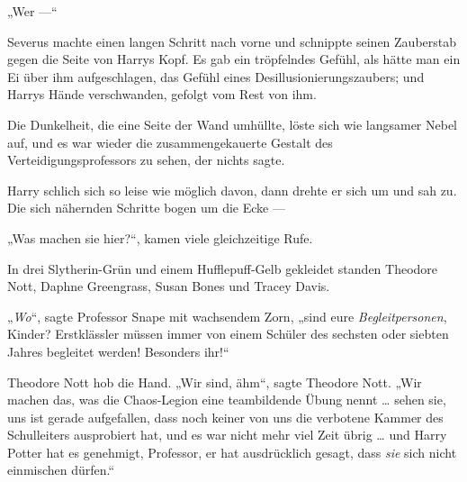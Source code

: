 „Wer —“

Severus machte einen langen Schritt nach vorne und schnippte seinen Zauberstab gegen die Seite von Harrys Kopf. Es gab ein tröpfelndes Gefühl, als hätte man ein Ei über ihm aufgeschlagen, das Gefühl eines Desillusionierungszaubers; und Harrys Hände verschwanden, gefolgt vom Rest von ihm.

Die Dunkelheit, die eine Seite der Wand umhüllte, löste sich wie langsamer Nebel auf, und es war wieder die zusammengekauerte Gestalt des Verteidigungsprofessors zu sehen, der nichts sagte.

Harry schlich sich so leise wie möglich davon, dann drehte er sich um und sah zu. Die sich nähernden Schritte bogen um die Ecke —

„Was machen sie hier?“, kamen viele gleichzeitige Rufe.

In drei Slytherin-Grün und einem Hufflepuff-Gelb gekleidet standen Theodore Nott, Daphne Greengrass, Susan Bones und Tracey Davis.

„\emph{Wo}“, sagte Professor Snape mit wachsendem Zorn, „sind eure \emph{Begleitpersonen}, Kinder? Erstklässler müssen immer von einem Schüler des sechsten oder siebten Jahres begleitet werden! Besonders ihr!“

Theodore Nott hob die Hand.
„Wir sind, ähm“, sagte Theodore Nott.
„Wir machen das, was die Chaos-Legion eine teambildende Übung nennt … sehen sie, uns ist gerade aufgefallen, dass noch keiner von uns die verbotene Kammer des Schulleiters ausprobiert hat, und es war nicht mehr viel Zeit übrig … und Harry Potter hat es genehmigt, Professor, er hat ausdrücklich gesagt, dass \emph{sie} sich nicht einmischen dürfen.“

